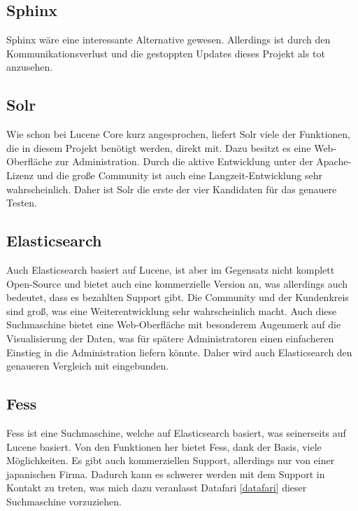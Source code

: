 \subsection{Sphinx}

Sphinx wäre eine interessante Alternative gewesen. Allerdings ist durch den Kommunikationsverlust und die gestoppten Updates dieses Projekt als tot anzusehen. \cite{SphinxTechnologiesInc.2019}

\subsection{Solr}

Wie schon bei Lucene Core kurz angesprochen, liefert Solr viele der Funktionen, die in diesem Projekt benötigt werden, direkt mit. Dazu besitzt es eine Web-Oberfläche zur Administration. Durch die aktive Entwicklung unter der Apache-Lizenz und die große Community ist auch eine Langzeit-Entwicklung sehr wahrscheinlich. Daher ist Solr die erste der vier Kandidaten für das genauere Testen. \cite{TheApacheSoftwareFoundation.2019}

\subsection{Elasticsearch}

Auch Elasticsearch basiert auf Lucene, ist aber im Gegensatz nicht komplett Open-Source und bietet auch eine kommerzielle Version an, was allerdings auch bedeutet, dass es bezahlten Support gibt. Die Community und der Kundenkreis sind groß, was eine Weiterentwicklung sehr wahrscheinlich macht. Auch diese Suchmaschine bietet eine Web-Oberfläche mit besonderem Augenmerk auf die Visualisierung der Daten, was für spätere Administratoren einen einfacheren Einstieg in die Administration liefern könnte. Daher wird auch Elasticsearch den genaueren Vergleich mit eingebunden. \cite{Elasticsearch.2019}

\subsection{Fess}

Fess ist eine Suchmaschine, welche auf Elasticsearch basiert, was seinerseits auf Lucene basiert. Von den Funktionen her bietet Fess, dank der Basis, viele Möglichkeiten. Es gibt auch kommerziellen Support, allerdings nur von einer japanischen Firma. Dadurch kann es schwerer werden mit dem Support in Kontakt zu treten, was mich dazu veranlasst Datafari \ref{datafari} dieser Suchmaschine vorzuziehen. \cite{CodeLibs.2019}

